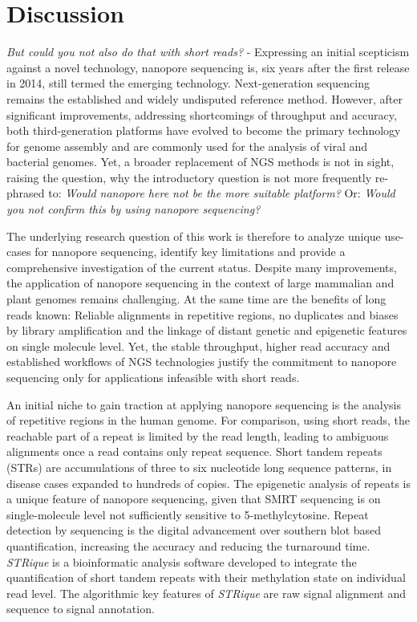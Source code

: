 \chapter{Discussion}
\label{cha:summary}

\textit{But could you not also do that with short reads?} - Expressing an initial scepticism against a novel technology, nanopore sequencing is, six years after the first release in 2014, still termed the emerging technology.
Next-generation sequencing remains the established and widely undisputed reference method.
However, after significant improvements, addressing shortcomings of throughput and accuracy, both third-generation platforms have evolved to become the primary technology for genome assembly and are commonly used for the analysis of viral and bacterial genomes.
Yet, a broader replacement of NGS methods is not in sight, raising the question, why the introductory question is not more frequently re-phrased to: \textit{Would nanopore here not be the more suitable platform?} Or: \textit{Would you not confirm this by using nanopore sequencing?}

The underlying research question of this work is therefore to analyze unique use-cases for nanopore sequencing, identify key limitations and provide a comprehensive investigation of the current status.
Despite many improvements, the application of nanopore sequencing in the context of large mammalian and plant genomes remains challenging.
At the same time are the benefits of long reads known: Reliable alignments in repetitive regions, no duplicates and biases by library amplification and the linkage of distant genetic and epigenetic features on single molecule level.
Yet, the stable throughput, higher read accuracy and established workflows of NGS technologies justify the commitment to nanopore sequencing only for applications infeasible with short reads.

An initial niche to gain traction at applying nanopore sequencing is the analysis of repetitive regions in the human genome.
For comparison, using short reads, the reachable part of a repeat is limited by the read length, leading to ambiguous alignments once a read contains only repeat sequence.
Short tandem repeats (STRs) are accumulations of three to six nucleotide long sequence patterns, in disease cases expanded to hundreds of copies.
The epigenetic analysis of repeats is a unique feature of nanopore sequencing, given that SMRT sequencing is on single-molecule level not sufficiently sensitive to 5-methylcytosine.
Repeat detection by sequencing is the digital advancement over southern blot based quantification, increasing the accuracy and reducing the turnaround time.
\textit{STRique} is a bioinformatic analysis software developed to integrate the quantification of short tandem repeats with their methylation state on individual read level.
The algorithmic key features of \textit{STRique} are raw signal alignment and sequence to signal annotation.



